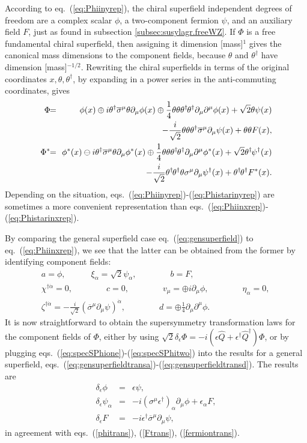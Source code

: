 \documentclass[12pt]{article}
\def\BDneg{-}
\def\BDplus{+}
\def\BDminus{-}
\def\thetasigmamuthetadagger{\theta\sigma^\mu\theta^\dagger}
\def\BDneg{}
\def\BDplus{-}
\def\BDminus{+}
\def\thetasigmamuthetadagger{\theta^\dagger\sigmabar^\mu\theta}
\def\BDneg{\ominus}
\def\BDplus{\oplus}
\def\BDminus{\ominus}
\def\thetasigmamuthetadagger{\theta\sigma^\mu\theta^\dagger}
\def\BDneg{\oplus}
\def\BDplus{\ominus}
\def\BDminus{\oplus}
\def\thetasigmamuthetadagger{\theta^\dagger\sigmabar^\mu\theta}
\newcommand{\thdthd}{\theta^\dagger\hspace{-1pt}\theta^\dagger}
\def\beq{\begin{eqnarray}}
\def\eeq{\end{eqnarray}}
\def\sigmabar{\overline\sigma}
\begin{document}
According to eq.~(\ref{eq:Phiinyrep}),
the chiral superfield independent degrees of freedom are a complex scalar $\phi$, 
a two-component fermion $\psi$,
and an auxiliary field $F$, just as found in
subsection \ref{subsec:susylagr.freeWZ}. 
If $\Phi$ is a free fundamental chiral superfield, 
then assigning it dimension [mass]$^1$
gives the canonical mass dimensions to the component fields, because
$\theta$ and $\theta^\dagger$ have dimension [mass]$^{-1/2}$. 
Rewriting the chiral superfields in terms of the 
original coordinates $x, \theta, \theta^\dagger$, by expanding in a power series in the 
anti-commuting coordinates, gives 
\beq
\Phi \!\!&=&\!\!
\phi(x) 
\BDminus i \thetasigmamuthetadagger \partial_\mu \phi(x)
\BDminus \frac{1}{4} \theta\theta\thdthd \partial_\mu \partial^\mu 
\phi(x)
+ \sqrt{2}\theta \psi(x) 
\nonumber \\ &&
- \frac{i}{\sqrt{2}} \theta\theta 
\theta^\dagger \sigmabar^\mu \partial_\mu \psi(x)
+ \theta\theta F(x),
\label{eq:Phiinxrep}
\\
\Phi^*
\!\!&=&\!\!
\phi^*(x) 
\BDplus i \thetasigmamuthetadagger  \partial_\mu \phi^*(x)
\BDminus \frac{1}{4} \theta\theta\thdthd \partial_\mu \partial^\mu 
\phi^*(x)
+ \sqrt{2}\theta^\dagger\hspace{-1pt} \psi^\dagger(x) 
\nonumber \\ &&
- \frac{i}{\sqrt{2}} \thdthd \theta \sigma^\mu \partial_\mu 
\psi^\dagger(x)
+ \thdthd F^*(x).
\label{eq:Phistarinxrep}
\eeq
Depending on the situation, eqs.~(\ref{eq:Phiinyrep})-(\ref{eq:Phistarinyrep}) are sometimes 
a more convenient representation than 
eqs.~(\ref{eq:Phiinxrep})-(\ref{eq:Phistarinxrep}).

By comparing the general superfield case 
eq.~(\ref{eq:gensuperfield}) to eq.~(\ref{eq:Phiinxrep}), we see that 
the latter can be 
obtained from the former by identifying component fields:
\beq
&& a = \phi,
\qquad\quad
\xi_\alpha = \sqrt{2} \psi_\alpha,
\qquad\qquad
b = F,
\label{eq:specSPhione}
\\
&& 
\chi^{\dagger\dot\alpha}  =0,
\qquad\qquad
c = 0,
\qquad\qquad
v_\mu = \BDneg i \partial_\mu \phi,
\qquad\qquad
\eta_\alpha = 0,
\phantom{xxx}
\\ 
&&
\zeta^{\dagger\dot\alpha} = 
-\frac{i}{\sqrt{2}} (\sigmabar^\mu \partial_\mu \psi)^{\dot\alpha}  ,
\qquad\qquad
d = \BDneg \frac{1}{4} \partial_\mu \partial^\mu \phi.
\label{eq:specSPhitwo}
\eeq
It is now straightforward to obtain the supersymmetry transformation 
laws for the component fields of 
$\Phi$, either by using 
$\sqrt{2} \delta_\epsilon \Phi = -i
(\epsilon \hat Q + \epsilon^\dagger \hat 
Q^\dagger) \Phi$, or by plugging 
eqs.~(\ref{eq:specSPhione})-(\ref{eq:specSPhitwo}) into the 
results for a general superfield, 
eqs.~(\ref{eq:gensuperfieldtransa})-(\ref{eq:gensuperfieldtransd}). 
The results are
\beq
\delta_\epsilon \phi &=& \epsilon \psi,\\
\delta_\epsilon \psi_\alpha &=& 
-i (\sigma^\mu \epsilon^\dagger)_\alpha \partial_\mu \phi + 
\epsilon_\alpha F
,
\\ 
\delta_\epsilon F &=& -i \epsilon^\dagger \sigmabar^\mu \partial_\mu \psi,
\label{eq:runningupthathill}
\eeq
in agreement with eqs.~(\ref{phitrans}), (\ref{Ftrans}), (\ref{fermiontrans}).
\end{document}
